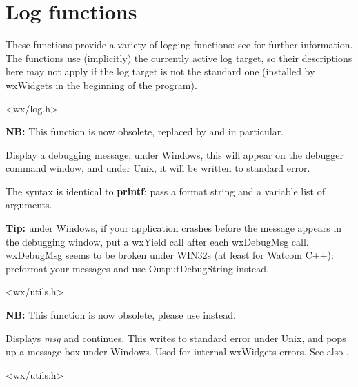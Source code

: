 \section{Log functions}\label{logfunctions}

These functions provide a variety of logging functions: see  for
further information. The functions use (implicitly) the currently active log
target, so their descriptions here may not apply if the log target is not the
standard one (installed by wxWidgets in the beginning of the program).


<wx/log.h>


\label{wxdebugmsg}


{\bf NB:} This function is now obsolete, replaced by  and  in particular.

Display a debugging message; under Windows, this will appear on the
debugger command window, and under Unix, it will be written to standard
error.

The syntax is identical to {\bf printf}: pass a format string and a
variable list of arguments.

{\bf Tip:} under Windows, if your application crashes before the
message appears in the debugging window, put a wxYield call after
each wxDebugMsg call. wxDebugMsg seems to be broken under WIN32s
(at least for Watcom C++): preformat your messages and use OutputDebugString
instead.


<wx/utils.h>


\label{wxerror}


{\bf NB:} This function is now obsolete, please use 
instead.

Displays {\it msg} and continues. This writes to standard error under
Unix, and pops up a message box under Windows. Used for internal
wxWidgets errors. See also .


<wx/utils.h>


